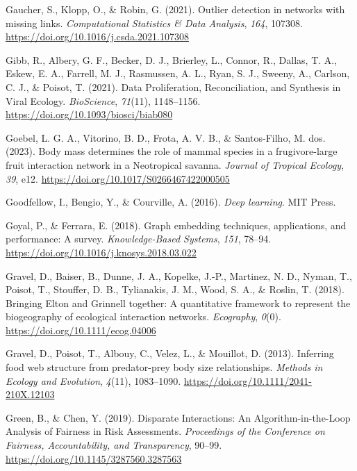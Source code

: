 \documentclass[11pt]{article}
\newlength{\cslhangindent}
\newenvironment{CSLReferences}[2] %
 {%
  \setlength{\parindent}{0pt}
  \ifodd #1 \everypar{\setlength{\hangindent}{\cslhangindent}}\ignorespaces\fi
  \ifnum #2 > 0
  \setlength{\parskip}{#2\baselineskip}
  \fi
 }%
 {}
\begin{document}
\begin{CSLReferences}{1}{0}
\leavevmode{}%
Gaucher, S., Klopp, O., \& Robin, G. (2021). Outlier detection in
networks with missing links. \emph{Computational Statistics \& Data
Analysis}, \emph{164}, 107308.
\url{https://doi.org/10.1016/j.csda.2021.107308}

\leavevmode{}%
Gibb, R., Albery, G. F., Becker, D. J., Brierley, L., Connor, R.,
Dallas, T. A., Eskew, E. A., Farrell, M. J., Rasmussen, A. L., Ryan, S.
J., Sweeny, A., Carlson, C. J., \& Poisot, T. (2021). Data
Proliferation, Reconciliation, and Synthesis in Viral Ecology.
\emph{BioScience}, \emph{71}(11), 1148--1156.
\url{https://doi.org/10.1093/biosci/biab080}

\leavevmode{}%
Goebel, L. G. A., Vitorino, B. D., Frota, A. V. B., \& Santos-Filho, M.
dos. (2023). Body mass determines the role of mammal species in a
frugivore-large fruit interaction network in a Neotropical savanna.
\emph{Journal of Tropical Ecology}, \emph{39}, e12.
\url{https://doi.org/10.1017/S0266467422000505}

\leavevmode{}%
Goodfellow, I., Bengio, Y., \& Courville, A. (2016). \emph{Deep
learning}. MIT Press.

\leavevmode{}%
Goyal, P., \& Ferrara, E. (2018). Graph embedding techniques,
applications, and performance: A survey. \emph{Knowledge-Based Systems},
\emph{151}, 78--94. \url{https://doi.org/10.1016/j.knosys.2018.03.022}

\leavevmode{}%
Gravel, D., Baiser, B., Dunne, J. A., Kopelke, J.-P., Martinez, N. D.,
Nyman, T., Poisot, T., Stouffer, D. B., Tylianakis, J. M., Wood, S. A.,
\& Roslin, T. (2018). Bringing Elton and Grinnell together: A
quantitative framework to represent the biogeography of ecological
interaction networks. \emph{Ecography}, \emph{0}(0).
\url{https://doi.org/10.1111/ecog.04006}

\leavevmode{}%
Gravel, D., Poisot, T., Albouy, C., Velez, L., \& Mouillot, D. (2013).
Inferring food web structure from predator-prey body size relationships.
\emph{Methods in Ecology and Evolution}, \emph{4}(11), 1083--1090.
\url{https://doi.org/10.1111/2041-210X.12103}

\leavevmode{}%
Green, B., \& Chen, Y. (2019). Disparate Interactions: An
Algorithm-in-the-Loop Analysis of Fairness in Risk Assessments.
\emph{Proceedings of the Conference on Fairness, Accountability, and
Transparency}, 90--99. \url{https://doi.org/10.1145/3287560.3287563}


\end{CSLReferences}
\end{document}
